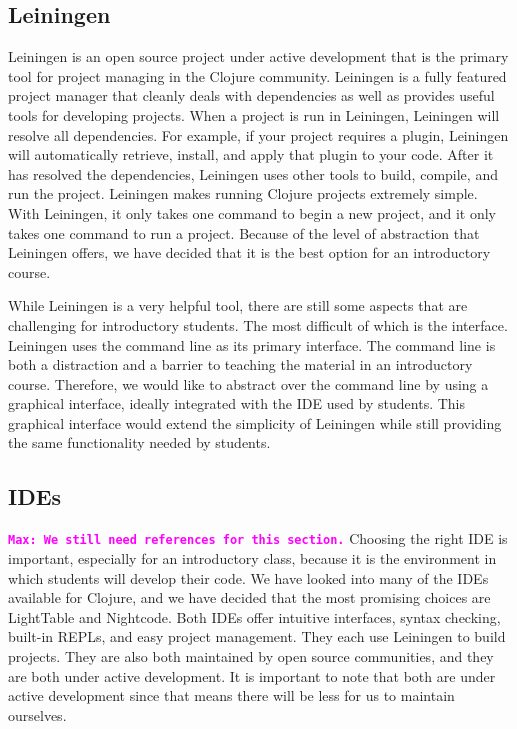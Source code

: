 \documentclass[12pt]{article}
\newcommand{\comment}[1]{{\bf \tt  {#1}}}
\newcommand{\emcomment}[1]{\textcolor{ForestGreen}{\comment{Elena: {#1}}}}
\newcommand{\mmcomment}[1]{\textcolor{magenta}{\comment{Max: {#1}}}}
\begin{document}
\subsection{Leiningen}
Leiningen is an open source project under active development that is the primary tool for project managing in the Clojure community\cite{LeinGitHub}. Leiningen is a fully featured project manager that cleanly deals with dependencies as well as provides useful tools for developing projects. When a project is run in Leiningen, Leiningen will resolve all dependencies. For example, if your project requires a plugin, Leiningen will automatically retrieve, install, and apply that plugin to your code. After it has resolved the dependencies, Leiningen uses other tools to build, compile, and run the project. Leiningen makes running Clojure projects extremely simple. With Leiningen, it only takes one command to begin a new project, and it only takes one command to run a project. Because of the level of abstraction that Leiningen offers, we have decided that it is the best option for an introductory course.

While Leiningen is a very helpful tool, there are still some aspects that are challenging for introductory students. The most difficult of which is the interface. Leiningen uses the command line as its primary interface. The command line is both a distraction and a barrier to teaching the material in an introductory course. Therefore, we would like to abstract over the command line by using a graphical interface, ideally integrated with the IDE used by students. This graphical interface would extend the simplicity of Leiningen while still providing the same functionality needed by students.

\subsection{IDEs}
\mmcomment{We still need references for this section.}
Choosing the right IDE is important, especially for an introductory class, because it is the environment in which students will develop their code. We have looked into many of the IDEs available for Clojure, and we have decided that the most promising choices are LightTable and Nightcode. Both IDEs offer intuitive interfaces, syntax checking, built-in REPLs, and easy project management. They each use Leiningen to build projects. They are also both maintained by open source communities, and they are both under active development. It is important to note that both are under active development since that means there will be less for us to maintain ourselves. 
\end{document}
